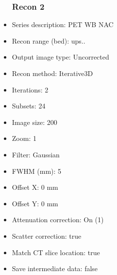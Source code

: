 \documentclass[12pt]{article}
\begin{document}
\begin{itemize}
\subsubsection{Recon 2}
\item Series description: PET WB NAC
\item Recon range (bed): ups..
\item Output image type: Uncorrected
\item Recon method: Iterative3D
\item Iterations: 2
\item Subsets: 24
\item Image size: 200
\item Zoom: 1
\item Filter: Gaussian
\item FWHM (mm): 5
\item Offset X: 0 mm
\item Offset Y: 0 mm
\item Attenuation correction: On (1)
\item Scatter correction: true
\item Match CT slice location: true
\item Save intermediate data: false
\end{itemize}
\end{document}
